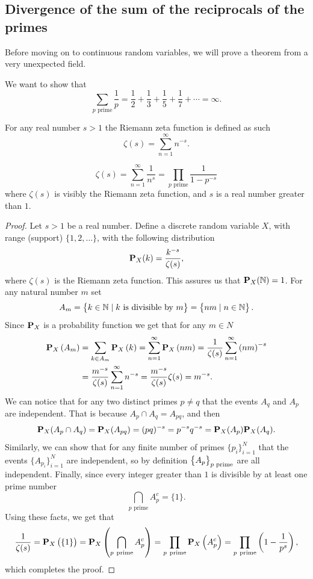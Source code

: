 \documentclass[11pt,a4paper]{article}
\begin{document}
\subsection{Divergence of the sum of the reciprocals of the primes}
Before moving on to continuous random variables, we will prove a theorem
from a very unexpected field.

\begin{theorem}
  \label{thm:drp}
  We want to show that
  \[
    \sum _{p{\text{ prime}}}{\frac {1}{p}} =
    {\frac {1}{2}}+
    {\frac {1}{3}}+
    {\frac {1}{5}}+
    {\frac {1}{7}}+
    \cdots = \infty.
  \]
\end{theorem}
\begin{definition}
  For any real number $s > 1$ the Riemann zeta function is defined
  as such
  \[
    \zeta(s) = \sum_{n=1}^{\infty} n^{-s}.
  \]
\end{definition}
\begin{lemma}\label{lem:epf}
  \[
    \zeta (s) =
    \sum _{n=1}^{\infty }{\frac {1}{n^{s}}} =
    \prod _{p{\text{ prime}}}{\frac {1}{1-p^{-s}}}
  \]
  where $\zeta(s)$ is visibly the Riemann zeta function, and $s$
  is a real number greater than $1$.
\end{lemma}
\begin{proof}
  Let $s > 1$ be a real number. Define a discrete random variable $X$,
  with range (support) $\{1,2,\dots\}$, with the following distribution
  \[
    \mathbf{P}_X(k) = \frac{k^{-s}}{\zeta(s)},
  \]
where $\zeta(s)$ is the Riemann zeta function.
This assures us that $\mathbf{P}_X(\mathbb{N}) = 1$. 
For any natural number $m$ set
\[
  A_m = 
  \left\{k \in \mathbb{N} \mid \text{$k$ is divisible by $m$}\right\} =
  \left\{nm \mid n \in \mathbb{N}\right\}.
\]
Since $\mathbf{P}_X$ is a probability function we get that for any $m \in N$
\begin{align*}
  \mathbf{P}_{X}\left(A_{m}\right) 
  &= \sum_{k \in A_{m}} \mathbf{P}_{X}\left(k\right)
  = \sum_{n=1}^{\infty} \mathbf{P}_{X}\left(n m\right)
  = {\frac{1}{\zeta(s)}} \sum_{n=1}^{\infty} \left(n m\right)^{-s} \\
  &= {\frac{m^{-s}}{\zeta(s)}} \sum_{n=1}^{\infty} n^{-s}
  = {\frac{m^{-s}}{\zeta(s)}} \zeta(s)
  = m^{-s}.
\end{align*}
We can notice that for any two distinct primes $p \neq q$ that the events
$A_q$ and $A_p$ are independent. That is because $A_p \cap A_q = A_{pq}$,
and then
\[
  \mathbf{P}_X(A_p \cap A_q) =
  \mathbf{P}_X(A_{pq}) =
  (pq)^{-s} =
  p^{-s} q^{-s} =
  \mathbf{P}_X(A_p) \mathbf{P}_X(A_q).
\]
Similarly, we can show that for any finite number of primes 
$\{p_i\}_{i=1}^{N}$ that the events $\{A_{p_i}\}_{i=1}^{N}$ are independent,
so by definition $\left\{A_p\right\}_{p \text{ prime}}$ are all independent.
Finally, since every integer greater than $1$ is divisible by at least
one prime number
\[
  \bigcap_{p\text{ prime}} A_p^c = \{1\}.
\]
Using these facts, we get that
\[
  {\frac{1}{\zeta(s)}} = 
  \mathbf{P}_{X}\left(\left\{1\right\}\right) = 
  \mathbf{P}_{X}\left(\bigcap_{p \ \mathrm{prime}} A_{p}^{c}\right) = 
  \prod_{p \ \mathrm{prime}} \mathbf{P}_{X}\left(A_{p}^{c}\right) = 
  \prod_{p \ \mathrm{prime}} \left(1 - \frac{1}{p^{s}}\right),
\]
which completes the proof.
\end{proof}
\end{document}
